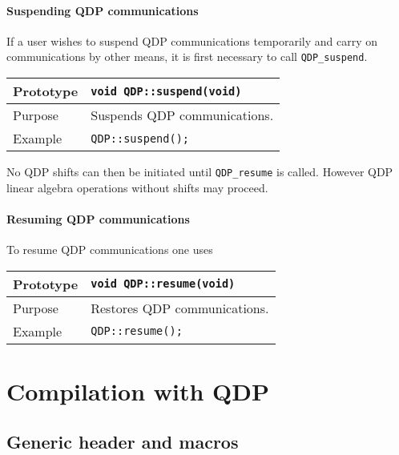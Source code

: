 \documentclass[12pt,letterpaper]{article}
\begin{document}
\paragraph{Suspending QDP communications}

If a user wishes to suspend QDP communications temporarily and carry
on communications by other means, it is first necessary to call
\verb|QDP_suspend|.

\begin{flushleft}
\begin{tabular}{|l|l|}
  \hline
  Prototype      & \verb|void QDP::suspend(void)| \\
\hline
Purpose        & Suspends QDP communications. \\
\hline
Example  & \verb|QDP::suspend();| \\
\hline
  \end{tabular}
\end{flushleft}
%
No QDP shifts can then be initiated until \verb|QDP_resume| is called.
However QDP linear algebra operations without shifts may proceed.

\paragraph{Resuming QDP communications}

To resume QDP communications one uses
\begin{flushleft}
\begin{tabular}{|l|l|}
  \hline
  Prototype      & \verb|void QDP::resume(void)| \\
\hline
Purpose        & Restores QDP communications. \\
\hline
Example  & \verb|QDP::resume();| \\
\hline
  \end{tabular}
\end{flushleft}

\newpage

\section{Compilation with QDP}

\subsection{Generic header and macros}
\end{document}
